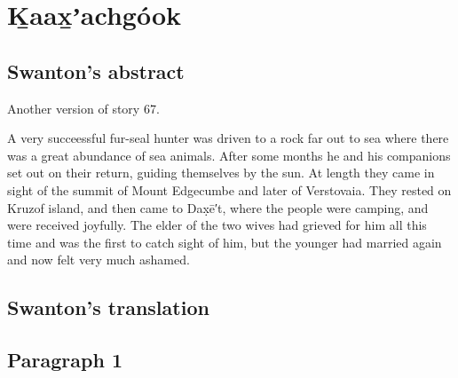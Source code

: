 
\resetexcnt
\chapter{Ḵaax̱ʼachgóok}\label{ch:101-khaaxhachgook}


\section{Swanton’s abstract}\label{sec:101-swanton-abstract}

Another version of story 67.

A very succeessful fur-seal hunter was driven to a rock far out to sea where there was a great abundance of sea animals.
After some months he and his companions set out on their return, guiding themselves by the sun.
At length they came in sight of the summit of Mount Edgecumbe and later of Verstovaia.
They rested on Kruzof island, and then came to Dax̣ē′t, where the people were camping, and were received joyfully.
The elder of the two wives had grieved for him all this time and was the first to catch sight of him, but the younger had married again and now felt very much ashamed.

\section{Swanton’s translation}\label{sec:101-swanton-translation}

\section{Paragraph 1}\label{sec:101-para-1}

